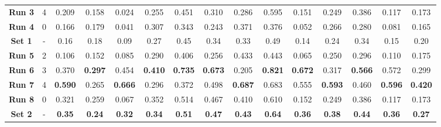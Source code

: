 \begin{table}[!ht]
{\begin{tabular}{|c|c|ccc|ccc|ccc|c|c|c|c|}
		\textbf{Run 3} & 4 & \multicolumn{1}{c|}{0.209} & \multicolumn{1}{c|}{0.158} & 0.024 & \multicolumn{1}{c|}{0.255} & \multicolumn{1}{c|}{0.451} & 0.310 & \multicolumn{1}{c|}{0.286} & \multicolumn{1}{c|}{0.595} & 0.151 & 0.249 & 0.386 & 0.117 & 0.173 \\ 
		
		\textbf{Run 4} & 0 & \multicolumn{1}{c|}{0.166} & \multicolumn{1}{c|}{0.179} & 0.041 & \multicolumn{1}{c|}{0.307} & \multicolumn{1}{c|}{0.343} & 0.243 & \multicolumn{1}{c|}{0.371} & \multicolumn{1}{c|}{0.376} & 0.052 & 0.266 & 0.280 & 0.081 & 0.165 \\ 
		
		\hline
	
		\textbf{Set 1} & - & \multicolumn{1}{c|}{0.16} & \multicolumn{1}{c|}{0.18} & 0.09 & \multicolumn{1}{c|}{0.27} & \multicolumn{1}{c|}{0.45} & 0.34 & \multicolumn{1}{c|}{0.33} & \multicolumn{1}{c|}{0.49} & 0.14 & 0.24 & 0.34 & 0.15 & 0.20 \\ 
	
		\hline
		\hline
	
		\textbf{Run 5} & 2 & \multicolumn{1}{c|}{0.106} & \multicolumn{1}{c|}{0.152} & 0.085 & \multicolumn{1}{c|}{0.290} & \multicolumn{1}{c|}{0.406} & 0.256 & \multicolumn{1}{c|}{0.433} & \multicolumn{1}{c|}{0.443} & 0.065 & 0.250 & 0.296 & 0.110 & 0.175 \\
		
		\textbf{Run 6} & 3 & \multicolumn{1}{c|}{0.370} & \multicolumn{1}{c|}{\textbf{0.297}} & 0.454 & \multicolumn{1}{c|}{\textbf{0.410}} & \multicolumn{1}{c|}{\textbf{0.735}} & \textbf{0.673} & \multicolumn{1}{c|}{0.205} & \multicolumn{1}{c|}{\textbf{0.821}} & \textbf{0.672} & 0.317 & \textbf{0.566} & 0.572 & 0.299 \\
		
		\textbf{Run 7} & 4 & \multicolumn{1}{c|}{\textbf{0.590}} & \multicolumn{1}{c|}{0.265} & \textbf{0.666} & \multicolumn{1}{c|}{0.296} & \multicolumn{1}{c|}{0.372} & 0.498 & \multicolumn{1}{c|}{\textbf{0.687}} & \multicolumn{1}{c|}{0.683} & 0.555 & \textbf{0.593} & 0.460 & \textbf{0.596} & \textbf{0.420} \\ 
		
		\textbf{Run 8} & 0 & \multicolumn{1}{c|}{0.321} & \multicolumn{1}{c|}{0.259} & 0.067 & \multicolumn{1}{c|}{0.352} & \multicolumn{1}{c|}{0.514} & 0.467 & \multicolumn{1}{c|}{0.410} & \multicolumn{1}{c|}{0.610} & 0.152 & 0.249 & 0.386 & 0.117 & 0.173 \\ 
		
		\hline
		
		\textbf{Set 2} & - & \multicolumn{1}{c|}{\textbf{0.35}} & \multicolumn{1}{c|}{\textbf{0.24}} & \textbf{0.32} & \multicolumn{1}{c|}{\textbf{0.34}} & \multicolumn{1}{c|}{\textbf{0.51}} & \textbf{0.47} & \multicolumn{1}{c|}{\textbf{0.43}} & \multicolumn{1}{c|}{\textbf{0.64}} & \textbf{0.36} & \textbf{0.38} & \textbf{0.44} & \textbf{0.36} & \textbf{0.27} \\ 
	
		\hline

	\end{tabular}}
	\label{tab:Experiment1.1Results}
\end{table}

